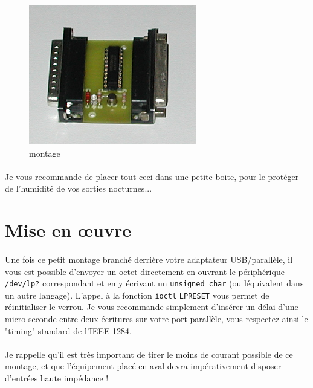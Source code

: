 \documentclass[11pt,a4paper]{book}
\begin{document}
 \begin{figure}
 \center
 \includegraphics[scale=1.1]{./medias/latch4.png}
 \caption{montage}
 \label{latch4}
 \end{figure}
 
 \paragraph*{}
 Je vous recommande de placer tout ceci dans une petite boite, pour le prot\'eger de l'humidit\'e
 de vos sorties nocturnes...

\section*{Mise en \oe uvre}

\paragraph*{}
Une fois ce petit montage branch\'e derri\`ere votre adaptateur USB/parall\`ele, il vous est
possible d'envoyer un octet directement en ouvrant le p\'eriph\'erique {\tt /dev/lp?} 
correspondant et en y \'ecrivant un {\tt unsigned char} (ou l\'equivalent dans un autre langage).
L'appel \`a la fonction {\tt ioctl} {\tt LPRESET} vous permet de r\'einitialiser le verrou. Je vous
recommande simplement d'ins\'erer un d\'elai d'une micro-seconde entre deux \'ecritures sur votre
port parall\`ele, vous respectez ainsi le "timing" standard de l'IEEE 1284.

\paragraph*{}
Je rappelle qu'il est tr\`es important de tirer le moins de courant possible de ce montage, et que
 l'\'equipement plac\'e en aval devra imp\'erativement disposer d'entr\'ees haute imp\'edance !

\listoffigures
\end{document}
